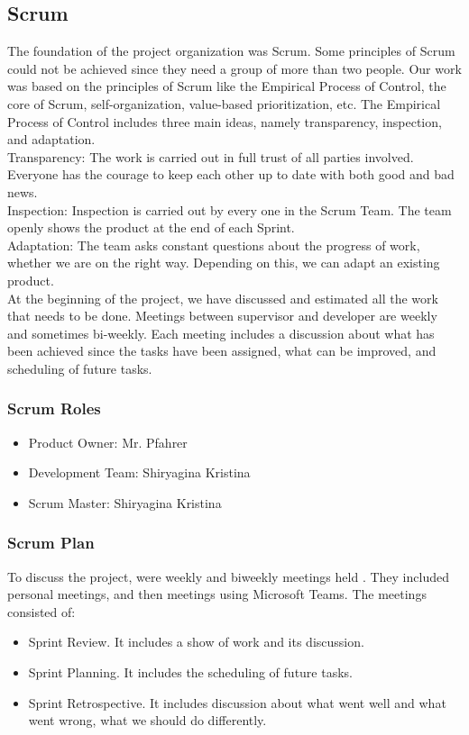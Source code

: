 \documentclass{scrartcl}
\begin{document}
 	    \subsection{Scrum}  	
 	    The foundation of the project organization was Scrum.
 	    Some principles of Scrum could not be achieved since they need a group of more than two people. 
 	    Our work was based on the principles of Scrum like the Empirical Process of Control, the core of Scrum, self-organization, value-based prioritization, etc.
 	    The Empirical Process of Control includes three main ideas, namely transparency, inspection, and adaptation. \\
 	    Transparency: The work is carried out in full trust of all parties involved. Everyone has the courage to keep each other up to date with both good and bad news. \\ 
 	    Inspection: Inspection is carried out by every one in the Scrum Team. The team openly shows the product at the end of each Sprint.			 \\
 	    Adaptation: The team asks constant questions about the progress of work, whether we are on the right way. Depending on this, we can adapt an existing product.		 \\
 	    
 	    At the beginning of the project, we have discussed and estimated all the work that needs to be done. 
 	    Meetings between supervisor and developer are weekly and sometimes bi-weekly.
 	    Each meeting includes a discussion about what has been achieved 
 	    since the tasks have been assigned, what can be improved, and scheduling of future tasks.
 	    
 	    
 	    
 	    
 	    
  		\subsubsection{Scrum Roles}
  		\begin{itemize}
  		\item Product Owner: Mr. Pfahrer
  		\item Development Team: Shiryagina Kristina
  		\item Scrum Master: Shiryagina Kristina
  		
  		\end{itemize}
  	    \subsubsection{Scrum Plan}
  	    To discuss the project, were weekly and biweekly meetings held . They included personal meetings, and then meetings using Microsoft Teams. The meetings consisted of:
  	    \begin{itemize}
  	    \item Sprint Review. It includes a show of work and its discussion.
  	    \item Sprint Planning. It includes the scheduling of future tasks.
  	    \item Sprint Retrospective. It includes discussion about what went well and what went wrong, what we should do differently. 
  	    \end{itemize}
\end{document}
